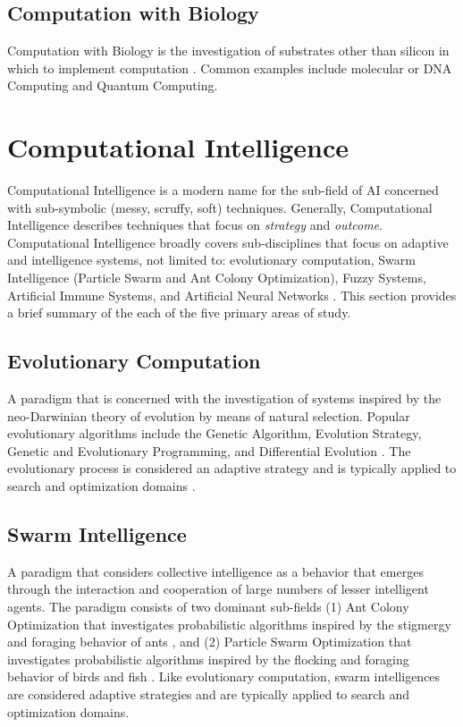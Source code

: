 \documentclass[a4paper, 11pt]{article}
\begin{document}
\subsection{Computation with Biology}
Computation with Biology is the investigation of substrates other than silicon in which to implement computation \cite{Aaronson2005}. Common examples include molecular or DNA Computing and Quantum Computing.

% 
% 
\section{Computational Intelligence}
\label{sec:computationl_intelligence}
Computational Intelligence is a modern name for the sub-field of AI concerned with sub-symbolic (messy, scruffy, soft) techniques. Generally, Computational Intelligence describes techniques that focus on \emph{strategy} and \emph{outcome}. 
Computational Intelligence broadly covers sub-disciplines that focus on adaptive and intelligence systems, not limited to: evolutionary computation, Swarm Intelligence (Particle Swarm and Ant Colony Optimization), Fuzzy Systems, Artificial Immune Systems, and Artificial Neural Networks \cite{Engelbrecht2007, Pedrycz1997}. This section provides a brief summary of the each of the five primary areas of study.

\subsection{Evolutionary Computation} 
A paradigm that is concerned with the investigation of systems inspired by the neo-Darwinian theory of evolution by means of natural selection. Popular evolutionary algorithms include the Genetic Algorithm, Evolution Strategy, Genetic and Evolutionary Programming, and Differential Evolution \cite{Baeck2000, Baeck2000a}. The evolutionary process is considered an adaptive strategy and is typically applied to search and optimization domains \cite{Goldberg1989, Holland1975}.

\subsection{Swarm Intelligence} 
A paradigm that considers collective intelligence as a behavior that emerges through the interaction and cooperation of large numbers of lesser intelligent agents. The paradigm consists of two dominant sub-fields (1) Ant Colony Optimization that investigates probabilistic algorithms inspired by the stigmergy and foraging behavior of ants \cite{Bonabeau1999, Dorigo2004}, and (2) Particle Swarm Optimization that investigates probabilistic algorithms inspired by the flocking and foraging behavior of birds and fish \cite{Shi2001}. Like evolutionary computation, swarm intelligences are considered adaptive strategies and are typically applied to search and optimization domains.
\end{document}
